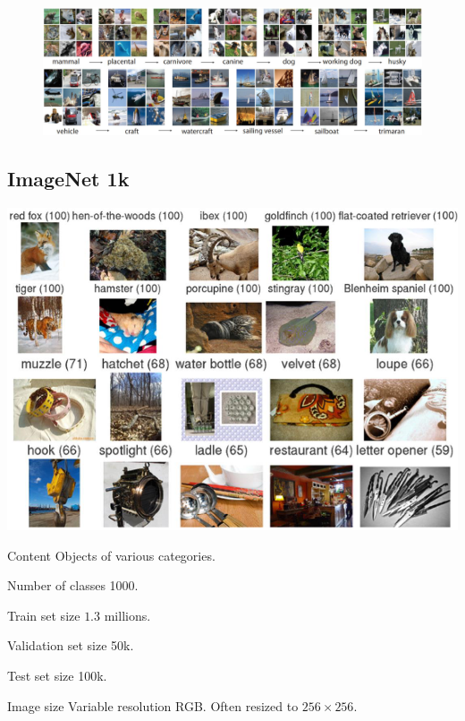 \begin{figure}[H]
    \centering
    \includegraphics[width=0.85\linewidth]{./img/imagenet21k.png}
\end{figure}


\subsection{ImageNet 1k}

\begin{minipage}{0.45\linewidth}
    \centering
    \includegraphics[width=\linewidth]{./img/imagenet1k.png}
\end{minipage}
\begin{minipage}{0.5\linewidth}
    \begin{descriptionlist}
        \item[Content] Objects of various categories.
        \item[Number of classes] 1000.
        \item[Train set size] $1.3$ millions.
        \item[Validation set size] 50k.
        \item[Test set size] 100k.
        \item[Image size] Variable resolution RGB. Often resized to $256 \times 256$.
    \end{descriptionlist}
\end{minipage}

